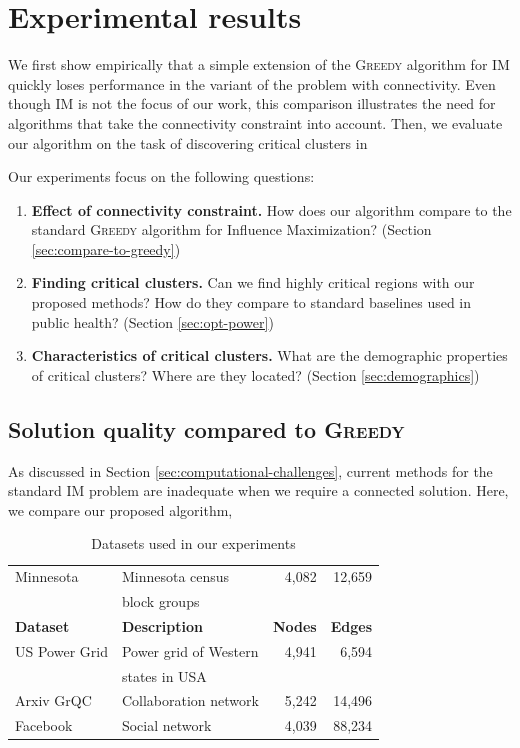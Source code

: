 \section{Experimental results}
\label{sec:experiments-cs}
We first show empirically that a simple extension of the \textsc{Greedy} algorithm for IM quickly loses performance in the variant of the problem with connectivity. Even though IM is not the focus of our work, this comparison illustrates the need for algorithms that take the connectivity constraint into account. Then, we evaluate our algorithm on the task of discovering critical clusters in 

Our experiments focus on the following questions:
\begin{enumerate}
\item \textbf{Effect of connectivity constraint.} How does our algorithm compare to the standard \textsc{Greedy} algorithm for Influence Maximization? (Section \ref{sec:compare-to-greedy})
\item \textbf{Finding critical clusters.} Can we find highly critical regions with our proposed methods? How do they compare to standard baselines used in public health? (Section \ref{sec:opt-power})
\item \textbf{Characteristics of critical clusters.} What are the demographic properties of critical clusters? Where are they located? (Section \ref{sec:demographics})
\end{enumerate}

\subsection{Solution quality compared to \textsc{Greedy}}
As discussed in Section \ref{sec:computational-challenges}, current methods for the standard IM problem are inadequate when we require a connected solution. Here, we compare our proposed algorithm, \algomaxcrit{}

\label{sec:compare-to-greedy}
\begin{table}[ht]
\centering \caption{Datasets used in our experiments}
\label{table:datasets}
\begin{tabular}{|l|l|r|r|}
\hline
Minnesota  & Minnesota census & 4,082 & 12,659 \\
& block groups & & \\
\hline
\textbf{Dataset}  & \textbf{Description} & \textbf{Nodes} & \textbf{Edges} \\
\hline
US Power Grid & Power grid of Western  & 	4,941 & 6,594\\
& states in USA & & \\
\hline
Arxiv GrQC & Collaboration network & 5,242 & 14,496 \\
\hline
Facebook  & Social network & 4,039 & 88,234\\
\hline
\end{tabular}
\end{table}

